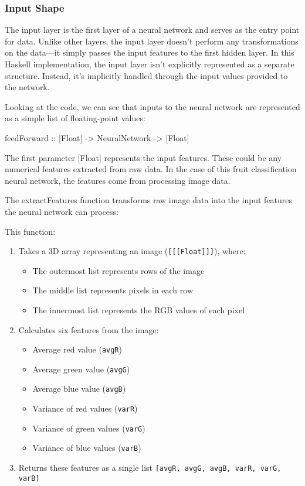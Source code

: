 \documentclass[12pt,a4paper]{article}
\begin{document}
\subsubsection{Input Shape}
The input layer is the first layer of a neural network and serves as the entry point for data. Unlike other layers, the input layer doesn't perform any transformations on the data—it simply passes the input features to the first hidden layer.
In this Haskell implementation, the input layer isn't explicitly represented as a separate structure. Instead, it's implicitly handled through the input values provided to the network.

Looking at the code, we can see that inputs to the neural network are represented as a simple list of floating-point values:\\

\begin{code}
feedForward :: [Float] -> NeuralNetwork -> [Float]
\end{code}

The first parameter [Float] represents the input features. These could be any numerical features extracted from raw data. In the case of this fruit classification neural network, the features come from processing image data.

The extractFeatures function transforms raw image data into the input features the neural network can process:

% 

This function:
\begin{enumerate}
  \item Takes a 3D array representing an image (\texttt{[[[Float]]]}), where:
  \begin{itemize}
    \item The outermost list represents rows of the image
    \item The middle list represents pixels in each row
    \item The innermost list represents the RGB values of each pixel
  \end{itemize}

  \item Calculates six features from the image:
  \begin{itemize}
    \item Average red value (\texttt{avgR})
    \item Average green value (\texttt{avgG})
    \item Average blue value (\texttt{avgB})
    \item Variance of red values (\texttt{varR})
    \item Variance of green values (\texttt{varG})
    \item Variance of blue values (\texttt{varB})
  \end{itemize}

  \item Returns these features as a single list \texttt{[avgR, avgG, avgB, varR, varG, varB]}
\end{enumerate}
\end{document}
